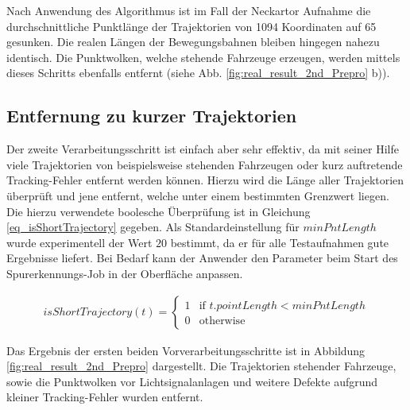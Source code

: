 Nach Anwendung des Algorithmus ist im Fall der Neckartor Aufnahme die durchschnittliche Punktlänge
der Trajektorien von 1094 Koordinaten auf 65 gesunken. Die realen Längen der Bewegungsbahnen bleiben
hingegen nahezu identisch. Die Punktwolken, welche stehende Fahrzeuge erzeugen, werden mittels dieses
Schritts ebenfalls entfernt (siehe Abb. \ref{fig:real_result_2nd_Prepro} b)).

\subsection{Entfernung zu kurzer Trajektorien}
Der zweite Verarbeitungsschritt ist einfach aber sehr effektiv, da mit seiner Hilfe viele
Trajektorien von beispielsweise stehenden Fahrzeugen oder kurz auftretende Tracking-Fehler entfernt
werden können. Hierzu wird die Länge aller Trajektorien überprüft und jene entfernt, welche
unter einem bestimmten Grenzwert liegen. Die hierzu verwendete boolesche Überprüfung ist in Gleichung
\ref{eq_isShortTrajectory} gegeben.
Als Standardeinstellung für $minPntLength$ wurde experimentell der Wert $20$ bestimmt, da er für alle
Testaufnahmen gute Ergebnisse liefert. Bei Bedarf kann der Anwender den Parameter beim Start des Spurerkennungs-Job
in der Oberfläche anpassen.

\begin{ceqn}
\begin{align}
\label{eq_isShortTrajectory}
    isShortTrajectory(t) =
    \begin{cases}
        1 & \text{if } t.pointLength < minPntLength \\
        0 & \text{otherwise}
    \end{cases}
\end{align}
\end{ceqn}

Das Ergebnis der ersten beiden Vorverarbeitungsschritte ist in Abbildung \ref{fig:real_result_2nd_Prepro} dargestellt.
Die Trajektorien stehender Fahrzeuge, sowie die Punktwolken vor Lichtsignalanlagen und weitere Defekte aufgrund
kleiner Tracking-Fehler wurden entfernt.

